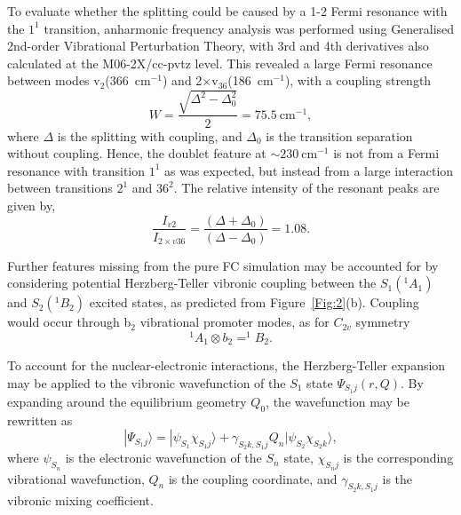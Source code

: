 \documentclass[journal=jpcafh,manuscript=article,layout=onecolumn, 12pt]{achemso}
\begin{document}
To evaluate whether the splitting could be caused by a 1-2 Fermi resonance with the $1^1$ transition, anharmonic frequency analysis was performed using Generalised 2nd-order Vibrational Perturbation Theory, with 3rd and 4th derivatives also calculated at the M06-2X/cc-pvtz level. This revealed a large Fermi resonance between modes v$_2$(366~cm$^{-1}$) and 2$\times$v$_{36}$(186~cm$^{-1}$), with a coupling strength
\begin{equation}
W = \frac{\sqrt{\Delta^2-\Delta_0^2}}{2} =75.5~\text{cm}^{-1},
\end{equation} 
where $\Delta$ is the splitting with coupling, and $\Delta_0$ is the transition separation without coupling. Hence, the doublet feature at $\sim230~$cm$^{-1}$ is not from a Fermi resonance with transition $1^1$ as was expected, but instead from a large interaction between transitions $2^1$ and $36^2$. The relative intensity of the resonant peaks are given by,
\begin{equation}
\frac{I_{v2}}{I_{2\times v36}} = \frac{\left(\Delta+\Delta_0\right)}{\left(\Delta-\Delta_0\right)}=1.08.
\end{equation}

Further features missing from the pure FC simulation may be accounted for by considering potential Herzberg-Teller vibronic coupling between the $S_1(^1A_1)$ and $S_2(^1B_2)$ excited states, as predicted from Figure~\ref{Fig:2}(b). Coupling would occur through b$_2$ vibrational promoter modes, as for $C_{2v}$ symmetry
\begin{equation}
^1A_1 \otimes b_2 = ^1B_2.
\end{equation}

To account for the nuclear-electronic interactions, the Herzberg-Teller expansion may be applied to the vibronic wavefunction of the $S_1$ state $\Psi_{S_1j}(r,Q)$. By expanding around the equilibrium geometry $Q_0$, the wavefunction may be rewritten as 
\begin{equation}
|\Psi_{S_1j} \rangle = |\psi_{S_1} \chi_{S_1j} \rangle + \gamma_{S_2k,S_1j}Q_n|\psi_{S_2} \chi_{S_2k}\rangle, 
\label{eq:shorthand}
\end{equation}
where $\psi_{S_n}$ is the electronic wavefunction of the $S_n$ state, $\chi_{S_nj}$ is the corresponding vibrational wavefunction, $Q_n$ is the coupling coordinate, and $\gamma_{S_2k,S_1j}$ is the vibronic mixing coefficient.
\end{document}
